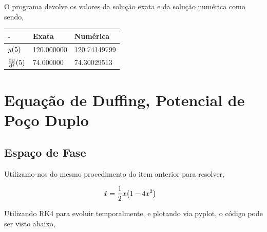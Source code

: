 \documentclass[twoside]{amsart}
\numberwithin{equation}{section}
\begin{document}
O programa devolve os valores da solução exata e da solução numérica como sendo,

\begin{table}[h]
    \begin{tabular}{lll}
    - &  Exata& Numérica \\\hline
    $y\qty(5)$  & 120.000000 & 120.74149799 \\\hline
    $\dv{y}{t}\qty(5)$  & 74.000000& 74.30029513
    \end{tabular}
\end{table}

\section{Equação de Duffing, Potencial de Poço Duplo}

\subsection{Espaço de Fase}

Utilizamo-nos do mesmo procedimento do item anterior para resolver,

\begin{align}
    \ddot x&=\frac12x\qty(1-4x^2)\nonumber
\end{align}

Utilizando RK4 para evoluir temporalmente, e plotando via pyplot, o código pode ser visto abaixo,
\end{document}
